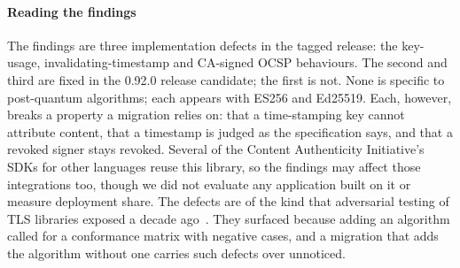 \paragraph{Reading the findings}
The findings are three implementation defects in the tagged release: the
key-usage, invalidating-timestamp and CA-signed OCSP behaviours. The second
and third are fixed in the 0.92.0 release candidate; the first is not. None is
specific to post-quantum algorithms; each
appears with ES256 and Ed25519. Each, however, breaks a property a migration
relies on: that a time-stamping key cannot attribute content, that a timestamp
is judged as the specification says, and that a revoked signer stays revoked.
Several of the Content Authenticity Initiative's SDKs for other languages reuse
this library, so the findings may affect those integrations too, though we did
not evaluate any application built on it or measure deployment share. The
defects are of the kind that adversarial testing of TLS libraries exposed a
decade ago~\cite{brubaker2014frankencerts,debnath2021ceres}. They surfaced
because adding an algorithm called for a conformance matrix with negative
cases, and a migration that adds the algorithm without one carries such defects
over unnoticed.

